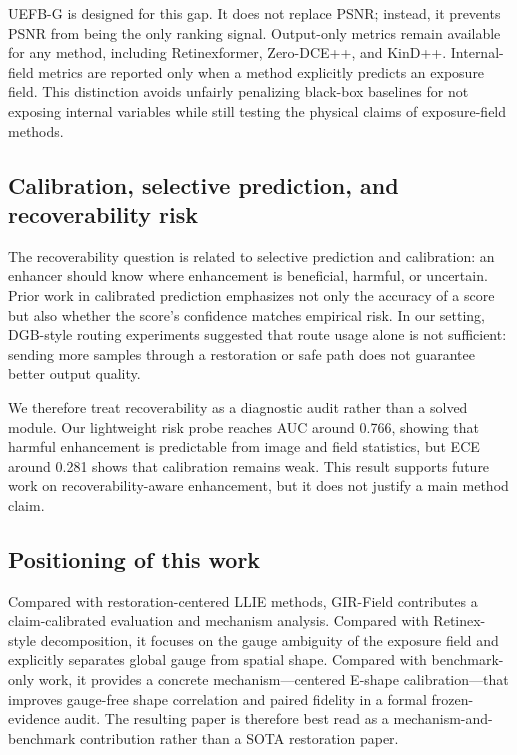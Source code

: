 UEFB-G is designed for this gap. It does not replace PSNR; instead, it prevents PSNR from being the only ranking signal. Output-only metrics remain available for any method, including Retinexformer, Zero-DCE++, and KinD++. Internal-field metrics are reported only when a method explicitly predicts an exposure field. This distinction avoids unfairly penalizing black-box baselines for not exposing internal variables while still testing the physical claims of exposure-field methods.

\subsection{Calibration, selective prediction, and recoverability risk}

The recoverability question is related to selective prediction and calibration: an enhancer should know where enhancement is beneficial, harmful, or uncertain. Prior work in calibrated prediction emphasizes not only the accuracy of a score but also whether the score's confidence matches empirical risk. In our setting, DGB-style routing experiments suggested that route usage alone is not sufficient: sending more samples through a restoration or safe path does not guarantee better output quality.

We therefore treat recoverability as a diagnostic audit rather than a solved module. Our lightweight risk probe reaches AUC around 0.766, showing that harmful enhancement is predictable from image and field statistics, but ECE around 0.281 shows that calibration remains weak. This result supports future work on recoverability-aware enhancement, but it does not justify a main method claim.

\subsection{Positioning of this work}

Compared with restoration-centered LLIE methods, GIR-Field contributes a claim-calibrated evaluation and mechanism analysis. Compared with Retinex-style decomposition, it focuses on the gauge ambiguity of the exposure field and explicitly separates global gauge from spatial shape. Compared with benchmark-only work, it provides a concrete mechanism---centered E-shape calibration---that improves gauge-free shape correlation and paired fidelity in a formal frozen-evidence audit. The resulting paper is therefore best read as a mechanism-and-benchmark contribution rather than a SOTA restoration paper.
